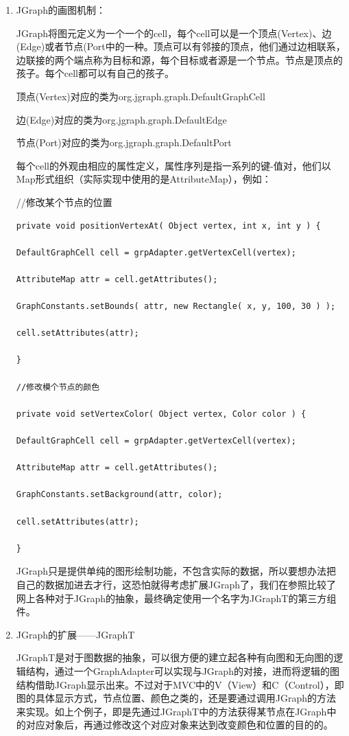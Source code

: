 \documentclass[a4paper,unicode=true,xetex]{article}
\begin{document}
\begin{enumerate}
\item JGraph的画图机制：

JGraph将图元定义为一个一个的cell，每个cell可以是一个顶点(Vertex)、边(Edge)或者节点(Port中的一种。顶点可以有邻接的顶点，他们通过边相联系，边联接的两个端点称为目标和源，每个目标或者源是一个节点。节点是顶点的孩子。每个cell都可以有自己的孩子。

顶点(Vertex)对应的类为org.jgraph.graph.DefaultGraphCell

边(Edge)对应的类为org.jgraph.graph.DefaultEdge

节点(Port)对应的类为org.jgraph.graph.DefaultPort

每个cell的外观由相应的属性定义，属性序列是指一系列的键-值对，他们以Map形式组织（实际实现中使用的是AttributeMap），例如：

//修改某个节点的位置
\begin{lstlisting}
private void positionVertexAt( Object vertex, int x, int y ) {

DefaultGraphCell cell = grpAdapter.getVertexCell(vertex);

AttributeMap attr = cell.getAttributes();

GraphConstants.setBounds( attr, new Rectangle( x, y, 100, 30 ) );

cell.setAttributes(attr);

}

//修改模个节点的颜色

private void setVertexColor( Object vertex, Color color ) {

DefaultGraphCell cell = grpAdapter.getVertexCell(vertex);

AttributeMap attr = cell.getAttributes();

GraphConstants.setBackground(attr, color);

cell.setAttributes(attr);

}
\end{lstlisting}
JGraph只是提供单纯的图形绘制功能，不包含实际的数据，所以要想办法把自己的数据加进去才行，这恐怕就得考虑扩展JGraph了，我们在参照比较了网上各种对于JGraph的抽象，最终确定使用一个名字为JGraphT的第三方组件。

\item JGraph的扩展——JGraphT

JGraphT是对于图数据的抽象，可以很方便的建立起各种有向图和无向图的逻辑结构，通过一个GraphAdapter可以实现与JGraph的对接，进而将逻辑的图结构借助JGraph显示出来。不过对于MVC中的V（View）和C（Control），即图的具体显示方式，节点位置、颜色之类的，还是要通过调用JGraph的方法来实现。如上个例子，即是先通过JGraphT中的方法获得某节点在JGraph中的对应对象后，再通过修改这个对应对象来达到改变颜色和位置的目的的。

\end{enumerate}
\end{document}
